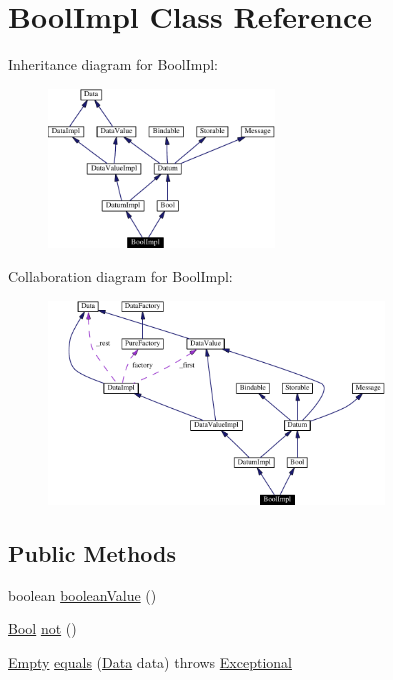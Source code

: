 \hypertarget{classBoolImpl}{
\section{Bool\-Impl  Class Reference}
\label{classBoolImpl}
}
Inheritance diagram for Bool\-Impl:\begin{figure}[H]
\begin{center}
\leavevmode
\includegraphics[width=170pt]{classBoolImpl__inherit__graph}
\end{center}
\end{figure}
Collaboration diagram for Bool\-Impl:\begin{figure}[H]
\begin{center}
\leavevmode
\includegraphics[width=253pt]{classBoolImpl__coll__graph}
\end{center}
\end{figure}
\subsection*{Public Methods}
\begin{CompactItemize}
\item 
boolean \hyperlink{classBoolImpl_a0}{boolean\-Value} ()
\item 
\hyperlink{interfaceBool}{Bool} \hyperlink{classBoolImpl_a1}{not} ()
\item 
\hyperlink{interfaceEmpty}{Empty} \hyperlink{classBoolImpl_a2}{equals} (\hyperlink{interfaceData}{Data} data) throws \hyperlink{classExceptional}{Exceptional}
\end{CompactItemize}
